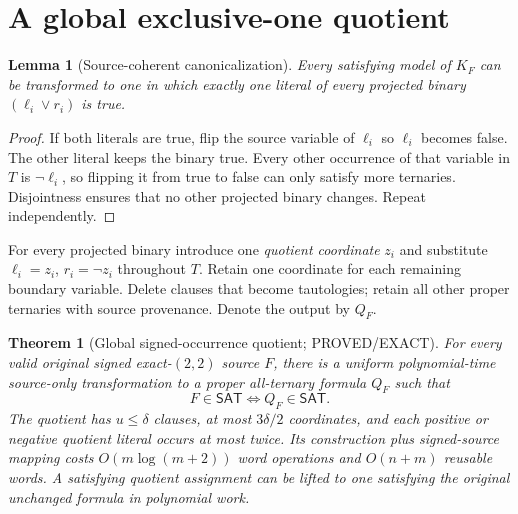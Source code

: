 \documentclass[11pt]{article}
\newtheorem{theorem}{Theorem}
\newtheorem{lemma}{Lemma}
\newcommand{\SAT}{\mathsf{SAT}}
\begin{document}
\section{A global exclusive-one quotient}
\begin{lemma}[Source-coherent canonicalization]
Every satisfying model of $K_F$ can be transformed to one in which \emph{exactly one} literal of every projected binary $(\ell_i\vee r_i)$ is true.
\end{lemma}
\begin{proof}
If both literals are true, flip the source variable of $\ell_i$ so $\ell_i$ becomes false. The other literal keeps the binary true. Every other occurrence of that variable in $T$ is $\neg\ell_i$, so flipping it from true to false can only satisfy more ternaries. Disjointness ensures that no other projected binary changes. Repeat independently.
\end{proof}
For every projected binary introduce one \emph{quotient coordinate} $z_i$ and substitute $\ell_i=z_i$, $r_i=\neg z_i$ throughout $T$. Retain one coordinate for each remaining boundary variable. Delete clauses that become tautologies; retain all other proper ternaries with source provenance. Denote the output by $Q_F$.
\begin{theorem}[Global signed-occurrence quotient; PROVED/EXACT]
For \emph{every} valid original signed exact-$(2,2)$ source $F$, there is a uniform polynomial-time source-only transformation to a proper all-ternary formula $Q_F$ such that
\[
\boxed{F\in\SAT\iff Q_F\in\SAT.}
\]
The quotient has $u\le\delta$ clauses, at most $3\delta/2$ coordinates, and each positive or negative quotient literal occurs at most twice. Its construction plus signed-source mapping costs $O(m\log(m+2))$ word operations and $O(n+m)$ reusable words. A satisfying quotient assignment can be lifted to one satisfying the \emph{original unchanged} formula in polynomial work.
\end{theorem}
\end{document}

